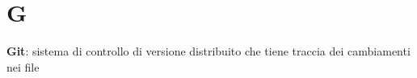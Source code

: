 \section{G}
\textbf{Git}: sistema di controllo di versione distribuito che tiene traccia dei cambiamenti nei file